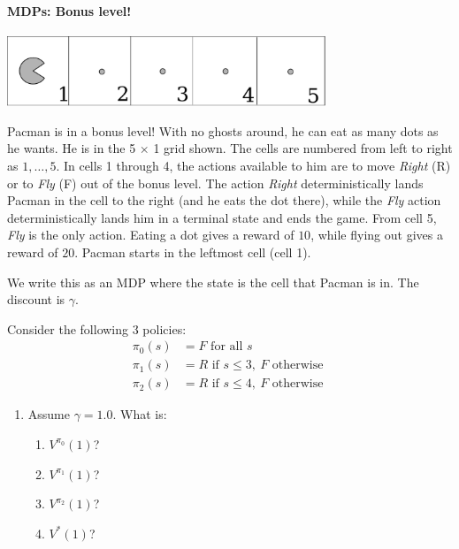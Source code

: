 \paragraph{MDPs: Bonus level!}
\begin{center}
\centering
\includegraphics[height=2.1cm]{figures/drawing2.pdf}
\vspace{1mm}
\end{center}

Pacman is in a bonus level! With no ghosts around, he can eat as many dots as he wants. He is in the 5 $\times$ 1 grid shown. The cells are numbered from left to right as $1,\ldots, 5$. In cells 1 through 4, the actions available to him are to move \emph{Right} (R) or to \emph{Fly} (F) out of the bonus level. The action \emph{Right} deterministically lands Pacman in the cell to the right (and he eats the dot there), while the \emph{Fly} action deterministically lands him in a terminal state and ends the game. From cell 5, \emph{Fly} is the only action.  Eating a dot gives a reward of $10$, while flying out gives a reward of $20$. Pacman starts in the leftmost cell (cell 1).

We write this as an MDP where the state is the cell that Pacman is in. The discount is $\gamma$.

Consider the following 3 policies:
\begin{align*}
\pi_0(s) &= F \textrm{ for all } s \\
\pi_1(s) &= R \textrm{ if }s \leq 3,\ F \textrm{ otherwise }\\
\pi_2(s) &= R \textrm{ if }s \leq 4,\ F \textrm{ otherwise }
\end{align*}

\begin{enumerate}


\item Assume $\gamma=1.0$. What is:
\vspace{10mm}
\begin{enumerate}
\item $V^{\pi_0}(1)$? 
\vspace{10mm}
\item $V^{\pi_1}(1)$? 
\vspace{10mm}
\item $V^{\pi_2}(1)$? 
\vspace{10mm}
\item $V^*(1)$?
\end{enumerate}
\vfill

\end{enumerate}